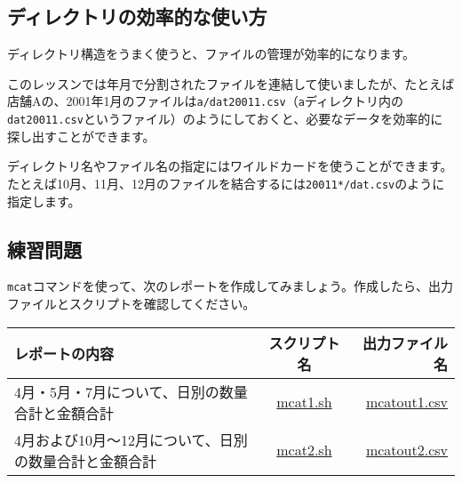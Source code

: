 \subsection{ディレクトリの効率的な使い方}

ディレクトリ構造をうまく使うと、ファイルの管理が効率的になります。

このレッスンでは年月で分割されたファイルを連結して使いましたが、たとえば店舗Aの、2001年1月のファイルは\verb|a/dat20011.csv|（\verb|a|ディレクトリ内の\verb|dat20011.csv|というファイル）のようにしておくと、必要なデータを効率的に探し出すことができます。

ディレクトリ名やファイル名の指定にはワイルドカードを使うことができます。たとえば10月、11月、12月のファイルを結合するには\verb|20011*/dat.csv|のように指定します。


\subsection{練習問題}

\verb|mcat|コマンドを使って、次のレポートを作成してみましょう。作成したら、出力ファイルとスクリプトを確認してください。

\begin{table}[htbp]
{\small
\begin{tabular}{ l | c || r }
\hline
\textbf{レポートの内容}   & \textbf{スクリプト名} & \textbf{出力ファイル名}  \\
\hline
4月・5月・7月について、日別の数量合計と金額合計 & \href{exercise/mcat1.sh}{mcat1.sh} & \href{exercise/outdat/mcatout1.csv}{mcatout1.csv} \\
4月および10月〜12月について、日別の数量合計と金額合計 & \href{exercise/mcat2.sh}{mcat2.sh} & \href{exercise/outdat/mcatout2.csv}{mcatout2.csv} \\

\hline
\end{tabular} 
}
\end{table} 


%
